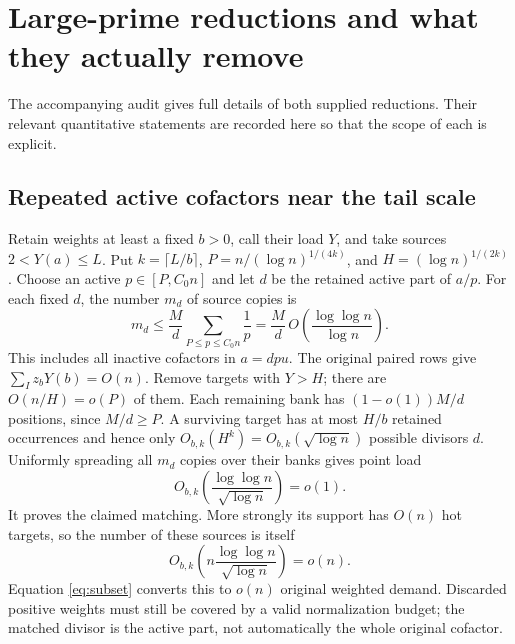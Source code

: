 \documentclass[11pt,a4paper]{article}
\begin{document}
\section{Large-prime reductions and what they actually remove}

The accompanying audit gives full details of both supplied reductions.
Their relevant quantitative statements are recorded here so that the
scope of each is explicit.

\subsection{Repeated active cofactors near the tail scale}
Retain weights at least a fixed $b>0$, call their load $Y$, and take
sources $2<Y(a)\le L$. Put $k=\lceil L/b\rceil$,
$P=n/(\log n)^{1/(4k)}$, and $H=(\log n)^{1/(2k)}$.
Choose an active $p\in[P,C_0n]$ and let $d$ be the retained active
part of $a/p$. For each fixed $d$, the number $m_d$ of source copies is
\[
 m_d\le\frac Md\sum_{P\le p\le C_0n}\frac1p
 =\frac Md\,O\!\left(\frac{\log\log n}{\log n}\right).
\]
This includes all inactive cofactors in $a=dpu$.
The original paired rows give $\sum_Iz_bY(b)=O(n)$.
Remove targets with $Y>H$; there are $O(n/H)=o(P)$ of them.
Each remaining bank has $(1-o(1))M/d$ positions, since $M/d\ge P$.
A surviving target has at most $H/b$ retained occurrences and hence
only $O_{b,k}(H^k)=O_{b,k}(\sqrt{\log n})$ possible divisors $d$.
Uniformly spreading all $m_d$ copies over their banks gives point load
\[
 O_{b,k}\!\left(\frac{\log\log n}{\sqrt{\log n}}\right)=o(1).
\]
It proves the claimed matching. More strongly its support has $O(n)$
hot targets, so the number of these sources is itself
\begin{equation}
 O_{b,k}\!\left(n\frac{\log\log n}{\sqrt{\log n}}\right)=o(n).
                                                               \label{eq:nearn}
\end{equation}
Equation \eqref{eq:subset} converts this to $o(n)$ original weighted
demand. Discarded positive weights must still be covered by a valid
normalization budget; the matched divisor is the active part, not
automatically the whole original cofactor.
\end{document}

